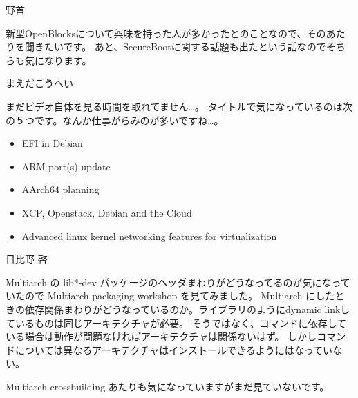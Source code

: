 \begin{prework}{ 野首 }

新型OpenBlocksについて興味を持った人が多かったとのことなので、そのあたりを聞きたいです。
あと、SecureBootに関する話題も出たという話なのでそちらも気になります。

\end{prework}

\begin{prework}{ まえだこうへい }

まだビデオ自体を見る時間を取れてません…。
タイトルで気になっているのは次の５つです。なんか仕事がらみのが多いですね…。

\begin{itemize}
 \item EFI in Debian
 \item ARM port(s) update
 \item AArch64 planning 
 \item XCP, Openstack, Debian and the Cloud
 \item Advanced linux kernel networking features for virtualization
\end{itemize}
\end{prework}

\begin{prework}{ 日比野 啓 }

Multiarch の lib*-dev パッケージのヘッダまわりがどうなってるのが気になっていたので Multiarch packaging workshop を見てみました。
Multiarch にしたときの依存関係まわりがどうなっているのか。ライブラリのようにdynamic linkしているものは同じアーキテクチャが必要。
そうではなく、コマンドに依存している場合は動作が問題なければアーキテクチャは関係ないはず。
しかしコマンドについては異なるアーキテクチャはインストールできるようにはなっていない。

Multiarch crossbuilding あたりも気になっていますがまだ見ていないです。

\end{prework}
